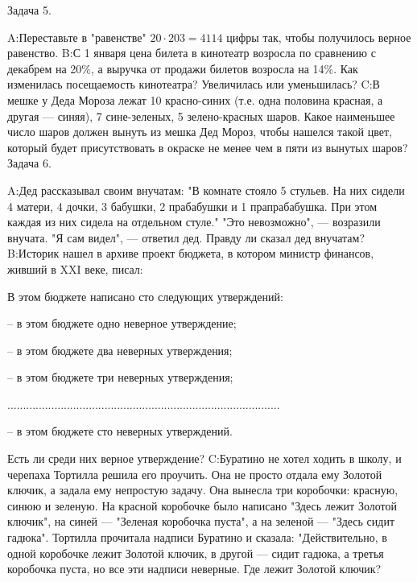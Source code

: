 \documentclass[11pt,a4paper,book]{ncc} \usepackage{modules/nonstahp_book}
\begin{document}
Задача 5.\par\noindent
A:\qquad Переставьте в "равенстве" $20\cdot 203=4114$ цифры так, чтобы получилось верное равенство.
\medbreak\noindent
B:\qquad С 1 января цена билета в кинотеатр возросла по сравнению с декабрем на 20\%, а выручка от продажи билетов возросла на 14\%. Как изменилась посещаемость кинотеатра? Увеличилась или уменьшилась?
\medbreak\noindent
C:\qquad В мешке у Деда Мороза лежат 10 красно-синих (т.е. одна половина красная, а другая — синяя), 7 сине-зеленых, 5 зелено-красных шаров. Какое наименьшее число шаров должен вынуть из мешка Дед Мороз, чтобы нашелся такой цвет, который будет присутствовать в окраске не менее чем в пяти из вынутых шаров?
\bigbreak\noindent
Задача 6.\par\noindent
A:\qquad Дед рассказывал своим внучатам: "В комнате стояло 5 стульев. На них сидели 4 матери, 4 дочки, 3 бабушки, 2 прабабушки и 1 прапрабабушка. При этом каждая из них сидела на отдельном стуле." "Это невозможно", — возразили внучата. "Я сам видел", — ответил дед. Правду ли сказал дед внучатам?
\medbreak\noindent
B:\qquad Историк  нашел в архиве проект бюджета, в котором министр финансов, живший в XXI веке, писал:\par
В этом бюджете написано сто следующих утверждений:

-- в этом бюджете одно неверное утверждение;

-- в этом бюджете два неверных утверждения;

-- в этом бюджете три неверных утверждения;

.......................................................................................

-- в этом бюджете сто неверных утверждений.

Есть ли среди них верное утверждение?
\medbreak\noindent
C:\qquad Буратино не хотел ходить в школу, и черепаха Тортилла решила его проучить. Она не просто отдала ему Золотой ключик, а задала ему непростую задачу. Она вынесла три коробочки: красную, синюю и зеленую. На красной коробочке было написано "Здесь лежит Золотой ключик", на синей — "Зеленая коробочка пуста", а на зеленой — "Здесь сидит гадюка". Тортилла прочитала надписи Буратино и сказала: "Действительно, в одной коробочке лежит Золотой ключик, в другой — сидит гадюка, а третья коробочка пуста, но все эти надписи неверные. Где лежит Золотой ключик?
\end{document}
